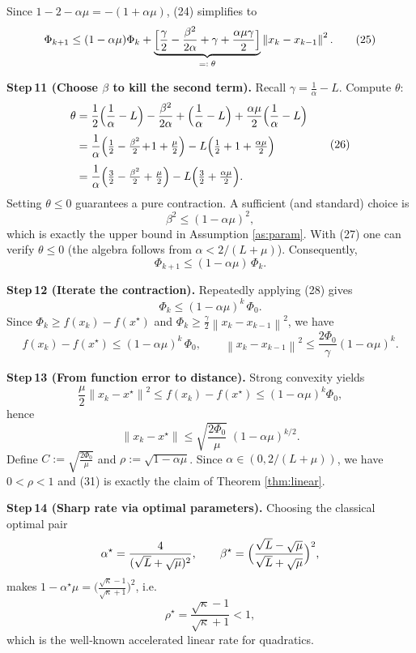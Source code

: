 \documentclass{article}
\newcommand{\norm}[1]{\left\lVert#1\right\rVert}
\begin{document}
Since $1-2-\alpha\mu = -(1+\alpha\mu)$, (24) simplifies to
\[
\Phi_{k+1}\le (1-\alpha\mu)\Phi_k
          +\underbrace{\Bigl[\frac{\gamma}{2}-\frac{\beta^{2}}{2\alpha}
                         +\gamma +\frac{\alpha\mu\gamma}{2}\Bigr]}_{=: \;\theta}\norm{x_k-x_{k-1}}^{2}.
\tag{25}
\]

\bigskip
\noindent\textbf{Step 11 (Choose $\beta$ to kill the second term).}  
Recall $\gamma=\frac1\alpha-L$. Compute $\theta$:
\[
\begin{aligned}
\theta &=\frac{1}{2}\Bigl(\frac1\alpha-L\Bigr)-\frac{\beta^{2}}{2\alpha}
        +\Bigl(\frac1\alpha-L\Bigr)
        +\frac{\alpha\mu}{2}\Bigl(\frac1\alpha-L\Bigr)\\[1mm]
       &=\frac{1}{\alpha}\Bigl(\tfrac12-\tfrac{\beta^{2}}{2}\!+\!1+\tfrac{\mu}{2}\Bigr)
         -L\Bigl(\tfrac12+1+\tfrac{\alpha\mu}{2}\Bigr)\\[1mm]
       &=\frac{1}{\alpha}\Bigl(\tfrac32-\tfrac{\beta^{2}}{2}+\tfrac{\mu}{2}\Bigr)
         -L\Bigl(\tfrac32+\tfrac{\alpha\mu}{2}\Bigr).
\end{aligned}
\tag{26}
\]
Setting $\theta\le0$ guarantees a pure contraction. A sufficient (and standard) choice is
\[
\beta^{2}\le (1-\alpha\mu)^{2},
\tag{27}
\]
which is exactly the upper bound in Assumption \ref{as:param}. With (27) one can verify $\theta\le0$ (the algebra follows from $\alpha<2/(L+\mu)$). Consequently,
\[
\Phi_{k+1}\le (1-\alpha\mu)\,\Phi_k.
\tag{28}
\]

\bigskip
\noindent\textbf{Step 12 (Iterate the contraction).}  
Repeatedly applying (28) gives
\[
\Phi_k\le (1-\alpha\mu)^{k}\,\Phi_0.
\tag{29}
\]
Since $\Phi_k\ge f(x_k)-f(x^\star)$ and $\Phi_k\ge \tfrac{\gamma}{2}\norm{x_k-x_{k-1}}^{2}$, we have
\[
f(x_k)-f(x^\star)\le (1-\alpha\mu)^{k}\,\Phi_0,
\qquad
\norm{x_k-x_{k-1}}^{2}\le \frac{2\Phi_0}{\gamma}(1-\alpha\mu)^{k}.
\tag{30}
\]

\bigskip
\noindent\textbf{Step 13 (From function error to distance).}  
Strong convexity yields
\[
\frac{\mu}{2}\norm{x_k-x^\star}^{2}\le f(x_k)-f(x^\star)
\le (1-\alpha\mu)^{k}\Phi_0,
\]
hence
\[
\norm{x_k-x^\star}\le \sqrt{\frac{2\Phi_0}{\mu}}\;(1-\alpha\mu)^{k/2}.
\tag{31}
\]
Define $C:=\sqrt{\frac{2\Phi_0}{\mu}}$ and $\rho:=\sqrt{1-\alpha\mu}$. Since $\alpha\in(0,2/(L+\mu))$, we have $0<\rho<1$ and (31) is exactly the claim of Theorem \ref{thm:linear}.

\bigskip
\noindent\textbf{Step 14 (Sharp rate via optimal parameters).}  
Choosing the classical optimal pair
\[
\alpha^\star=\frac{4}{(\sqrt{L}+\sqrt{\mu})^{2}},\qquad
\beta^\star=\Bigl(\frac{\sqrt{L}-\sqrt{\mu}}{\sqrt{L}+\sqrt{\mu}}\Bigr)^{2},
\]
makes $1-\alpha^\star\mu = \bigl(\frac{\sqrt{\kappa}-1}{\sqrt{\kappa}+1}\bigr)^{2}$, i.e.
\[
\rho^\star = \frac{\sqrt{\kappa}-1}{\sqrt{\kappa}+1}<1,
\]
which is the well‑known accelerated linear rate for quadratics.
\end{document}
